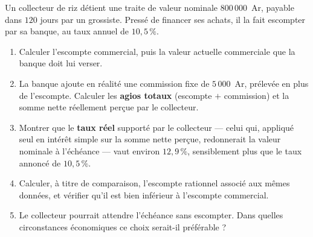 \begin{jecherche}
Un collecteur de riz détient une traite de valeur nominale $800\,000$~Ar,
payable dans $120$ jours par un grossiste. Pressé de financer ses achats, il
la fait escompter par sa banque, au taux annuel de $10{,}5\,\%$.

\begin{enumerate}[label=\textbf{\arabic*.}, leftmargin=*, itemsep=0.3em]
  \item Calculer l'escompte commercial, puis la valeur actuelle commerciale
        que la banque doit lui verser.
  \item La banque ajoute en réalité une commission fixe de $5\,000$~Ar,
        prélevée en plus de l'escompte. Calculer les \textbf{agios totaux}
        (escompte $+$ commission) et la somme nette réellement perçue par le
        collecteur.
  \item Montrer que le \textbf{taux réel} supporté par le collecteur — celui
        qui, appliqué seul en intérêt simple sur la somme nette perçue,
        redonnerait la valeur nominale à l'échéance — vaut environ
        $12{,}9\,\%$, sensiblement plus que le taux annoncé de $10{,}5\,\%$.
  \item Calculer, à titre de comparaison, l'escompte rationnel associé aux
        mêmes données, et vérifier qu'il est bien inférieur à l'escompte
        commercial.
  \item Le collecteur pourrait attendre l'échéance sans escompter. Dans
        quelles circonstances économiques ce choix serait-il préférable ?
\end{enumerate}
\end{jecherche}

